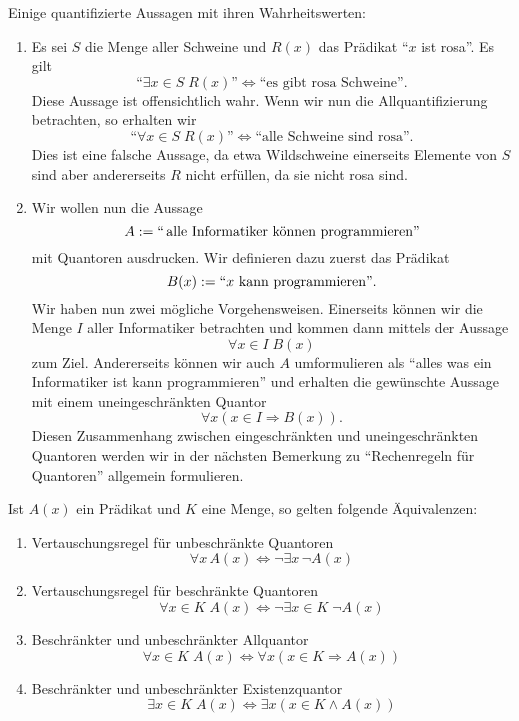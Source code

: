 \begin{bsp}
 Einige quantifizierte Aussagen mit ihren Wahrheitswerten:
\begin{enumerate}
 \item Es sei $S$ die Menge aller Schweine und $R(x)$ das Prädikat ``$x$ ist rosa''. Es gilt
\[
 \text{``}\exists x\in S\; R(x)\text{''}\Leftrightarrow\text{``es gibt rosa Schweine''}.
\]
Diese Aussage ist offensichtlich wahr. Wenn wir nun die Allquantifizierung betrachten, so erhalten wir
\[
 \text{``}\forall x\in S\; R(x)\text{''}\Leftrightarrow\text{``alle Schweine sind rosa''}.
\]
Dies ist eine falsche Aussage, da etwa Wildschweine einerseits Elemente von $S$ sind aber andererseits $R$ nicht erfüllen, da sie nicht rosa sind.
\item Wir wollen nun die Aussage
\[
A:=``\,\text{alle Informatiker können programmieren''}
\]
mit Quantoren ausdrucken.
Wir definieren dazu zuerst das Prädikat
\[
B(x):=``x\text{ kann programmieren''}.
\]
Wir haben nun zwei mögliche Vorgehensweisen. Einerseits können wir die Menge $I$ aller Informatiker betrachten und kommen dann mittels der Aussage
\[
 \forall x\in I\;B(x)
\]
zum Ziel. Andererseits können wir auch $A$ umformulieren als ``alles was ein Informatiker ist kann programmieren'' und erhalten die gewünschte Aussage mit einem uneingeschränkten Quantor
\[
 \forall x(x\in I\Rightarrow B(x)).
\]
Diesen Zusammenhang zwischen eingeschränkten und uneingeschränkten Quantoren werden wir in der nächsten Bemerkung zu ``Rechenregeln für Quantoren'' allgemein formulieren.
\end{enumerate}
\end{bsp}

\begin{rk}[Quantorenregeln]
 Ist $A(x)$ ein Prädikat und $K$ eine Menge, so gelten folgende Äquivalenzen:
\begin{enumerate}
 \item Vertauschungsregel für unbeschränkte Quantoren
\[
 \forall x\, A(x)\Leftrightarrow \neg\exists x\,\neg A(x)
\]
\item Vertauschungsregel für beschränkte Quantoren
\[
 \forall x\in K \;A(x)\Leftrightarrow \neg\exists x\in K\;\neg A(x)
\]
\item Beschränkter und unbeschränkter Allquantor
\[
 \forall x\in K\;A(x)\Leftrightarrow \forall x(x\in K\Rightarrow A(x))
\]
\item Beschränkter und unbeschränkter Existenzquantor
\[
\exists x\in K\; A(x)\Leftrightarrow \exists x(x\in K\wedge A(x))
\]
\end{enumerate}
\end{rk}

